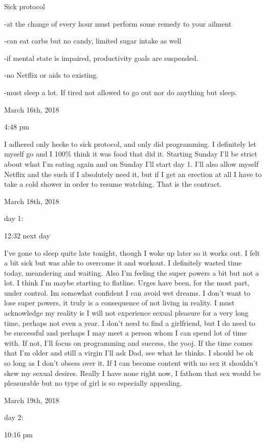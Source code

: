 Sick protocol

-at the change of every hour must perform some remedy to your ailment

-can eat carbs but no candy, limited sugar intake as well

-if mental state is impaired, productivity goals are suspended.

-no Netflix or aids to existing.

-must sleep a lot. If tired not allowed to go out nor do anything but
sleep.

\bigskip
\bigskip
March 16th, 2018

4:48 pm

I adhered only hecke to sick protocol, and only did programming. I
definitely let myself go and I 100\% think it was food that did it.
Starting Sunday I'll be strict about what I'm eating again and on Sunday
I'll start day 1. I'll also allow myself Netflix and the such if I
absolutely need it, but if I get an erection at all I have to take a
cold shower in order to resume watching. That is the contract.

\bigskip
\bigskip
March 18th, 2018

day 1:

12:32 next day

I've gone to sleep quite late tonight, though I woke up later so it
works out. I felt a bit sick but was able to overcome it and workout. I
definitely wasted time today, meandering and waiting. Also I'm feeling
the super powers a bit but not a lot. I think I'm maybe starting to
flatline. Urges have been, for the most part, under control. Im somewhat
confident I can avoid wet dreams. I don't want to lose super powers, it
truly is a consequence of not living in reality. I must acknowledge my
reality is I will not experience sexual pleasure for a very long time,
perhaps not even a year. I don't need to find a girlfriend, but I do
need to be successful and perhaps I may meet a person whom I can spend
lot of time with. If not, I'll focus on programming and success, the
yooj. If the time comes that I'm older and still a virgin I'll ask Dad,
see what he thinks. I should be ok so long as I don't obsess over it. If
I can become content with no sex it shouldn't skew my sexual desires.
Really I have none right now, I fathom that sex would be pleasurable but
no type of girl is so especially appealing.

\bigskip
\bigskip
March 19th, 2018

day 2:

10:16 pm

